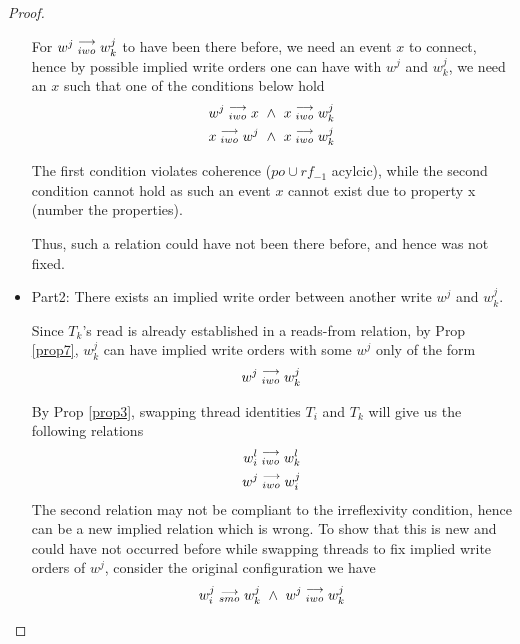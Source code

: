 \begin{proof}
\begin{itemize}
                For $w^j\stackrel{\longrightarrow}{_{iwo}}w_k^j$ to have been there before, we need an event $x$ to connect, hence by possible implied write orders one can have with $w^j$ and $w_k^j$, we need an $x$ such that one of the conditions below hold
                \begin{align*}
                    w^j\stackrel{\longrightarrow}{_{iwo}}x \ \wedge \ x\stackrel{\longrightarrow}{_{iwo}}w_k^j \\ 
                    x\stackrel{\longrightarrow}{_{iwo}}w^j \ \wedge \ x\stackrel{\longrightarrow}{_{iwo}}w_k^j
                \end{align*}

                The first condition violates coherence ($po \cup rf_{-1}$ acylcic), while the second condition cannot hold as such an event $x$ cannot exist due to property x (number the properties).
                
                Thus, such a relation could have not been there before, and hence was not fixed. 


                \item Part2: There exists an implied write order between another write $w^j$ and $w_k^j$.

                Since $T_k$'s read is already established in a reads-from relation, by Prop \ref{prop7}, $w_k^j$ can have implied write orders with some $w^j$ only of the form 
                \begin{align*}
                    w^j\stackrel{\longrightarrow}{_{iwo}}w_k^j
                \end{align*}

                By Prop \ref{prop3}, swapping thread identities $T_i$ and $T_k$ will give us the following relations 
                \begin{align*}
                    w_i^l\stackrel{\longrightarrow}{_{iwo}}w_k^l \\ 
                    w^j\stackrel{\longrightarrow}{_{iwo}}w_i^j 
                \end{align*}
                The second relation may not be compliant to the irreflexivity condition, hence can be a new implied relation which is wrong. To show that this is new and could have not occurred before while swapping threads to fix implied write orders of $w^j$, consider the original configuration we have 
                \begin{align*}
                    \reln{w_i^j}{smo}{w_k^j} \ \wedge \ \reln{w^j}{iwo}{w_k^j}
                \end{align*}


\end{itemize}
\end{proof}
